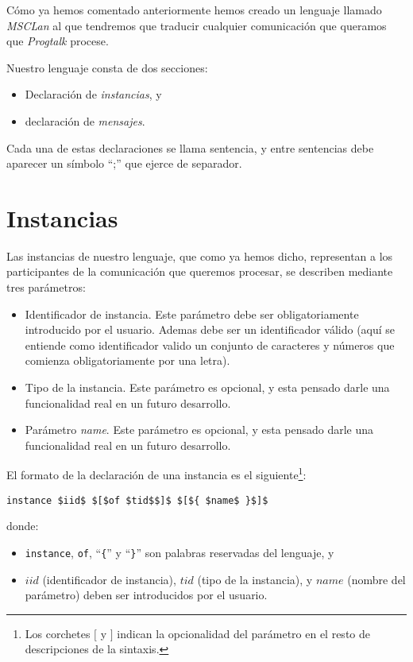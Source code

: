 Cómo ya hemos comentado anteriormente hemos creado un lenguaje llamado
\textit{MSCLan} al que tendremos que traducir cualquier comunicación
que queramos que \textit{Progtalk} procese.

Nuestro lenguaje consta de dos secciones:
\begin{itemize}
\item Declaración de \textit{instancias}, y
\item declaración de \textit{mensajes}.
\end{itemize}

Cada una de estas declaraciones se llama sentencia, y entre sentencias
debe aparecer un símbolo ``;'' que ejerce de separador.

\section{Instancias}\label{sec:Instancias}

Las instancias de nuestro lenguaje, que como ya hemos dicho,
representan a los participantes de la comunicación que queremos
procesar, se describen mediante tres
parámetros:

\begin{itemize}
\item Identificador de instancia. Este parámetro debe ser
  obligatoriamente introducido por el usuario. Ademas debe ser un
  identificador válido (aquí se entiende como identificador valido un
  conjunto de caracteres y números que comienza obligatoriamente por
  una letra).
\item Tipo de la instancia. Este parámetro es opcional, y esta pensado
  darle una funcionalidad real en un futuro desarrollo.
\item Parámetro \textit{name}. Este parámetro es opcional, y esta
  pensado darle una funcionalidad real en un futuro desarrollo.
\end{itemize}

El formato de la declaración de una instancia es el
siguiente\footnote{Los corchetes $[$ y $]$ indican la opcionalidad del
  parámetro en el resto de descripciones de la sintaxis.}:
\begin{center}
  \begin{minipage}{0.40\linewidth}
\begin{lstlisting}[mathescape]
instance $iid$ $[$of $tid$$]$ $[${ $name$ }$]$
\end{lstlisting}
  \end{minipage}
\end{center}
donde:
\begin{itemize}
\item \lstinline{instance}, \lstinline{of}, ``\lstinline!{!'' y
    ``\lstinline!}!'' son palabras reservadas del lenguaje, y
\item $iid$ (identificador de instancia), $tid$ (tipo de la
  instancia), y $name$ (nombre del parámetro) deben ser introducidos
  por el usuario.
\end{itemize}

